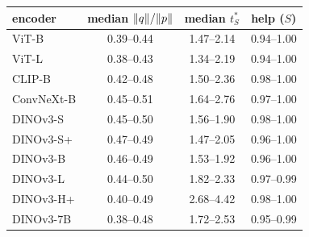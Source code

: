 \begin{tabular}{lccc}
\toprule
encoder & median $\lVert q \rVert/\lVert p \rVert$ & median $t^*_S$ & help ($S$) \\
\midrule
ViT-B & 0.39--0.44 & 1.47--2.14 & 0.94--1.00 \\
ViT-L & 0.38--0.43 & 1.34--2.19 & 0.94--1.00 \\
CLIP-B & 0.42--0.48 & 1.50--2.36 & 0.98--1.00 \\
ConvNeXt-B & 0.45--0.51 & 1.64--2.76 & 0.97--1.00 \\
DINOv3-S & 0.45--0.50 & 1.56--1.90 & 0.98--1.00 \\
DINOv3-S+ & 0.47--0.49 & 1.47--2.05 & 0.96--1.00 \\
DINOv3-B & 0.46--0.49 & 1.53--1.92 & 0.96--1.00 \\
DINOv3-L & 0.44--0.50 & 1.82--2.33 & 0.97--0.99 \\
DINOv3-H+ & 0.40--0.49 & 2.68--4.42 & 0.98--1.00 \\
DINOv3-7B & 0.38--0.48 & 1.72--2.53 & 0.95--0.99 \\
\bottomrule
\end{tabular}

